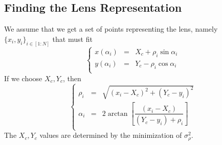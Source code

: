 \documentclass[aps,onecolumn]{revtex4}
\begin{document}
\subsection{Finding the Lens Representation}
We assume that we get a set of points representing the lens, namely $\lbrace x_i,y_i \rbrace_{i\in[1:N]}$ that must
fit
\begin{equation}
	\left\lbrace
		\begin{array}{rcl}
	x(\alpha_i) & = & X_c + \rho_i\sin\alpha_i\\
	y(\alpha_i) & = & Y_c - \rho_i\cos\alpha_i\\
		\end{array}
	\right.
\end{equation}
If we choose $X_c,Y_c$, then
\begin{equation}
	\left\lbrace
	\begin{array}{rcl}	
	\rho_i   &=&\sqrt{\left(x_i-X_c\right)^2+\left(Y_c-y_i\right)^2}\\
	\alpha_i &=& 2 \arctan\left[ \dfrac{\left(x_i-X_c\right)}{\left(Y_c-y_i\right)+\rho_i}\right]\\
	\end{array}
	\right.
\end{equation}
The $X_c,Y_c$ values are determined by the minimization of $\sigma^2_\rho$.
\end{document}
